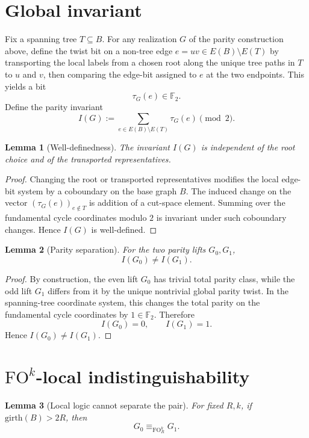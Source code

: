\documentclass[11pt]{article}
\newtheorem{lemma}{Lemma}
\begin{document}
\section{Global invariant}

Fix a spanning tree \(T\subseteq B\). For any realization \(G\) of the parity construction above, define the twist bit on a non-tree edge \(e=uv\in E(B)\setminus E(T)\) by transporting the local labels from a chosen root along the unique tree paths in \(T\) to \(u\) and \(v\), then comparing the edge-bit assigned to \(e\) at the two endpoints. This yields a bit
\[
\tau_G(e)\in \mathbb F_2.
\]
Define the parity invariant
\[
I(G):=\sum_{e\in E(B)\setminus E(T)} \tau_G(e)\pmod 2.
\]

\begin{lemma}[Well-definedness]
The invariant \(I(G)\) is independent of the root choice and of the transported representatives.
\end{lemma}

\begin{proof}
Changing the root or transported representatives modifies the local edge-bit system by a coboundary on the base graph \(B\). The induced change on the vector \((\tau_G(e))_{e\notin T}\) is addition of a cut-space element. Summing over the fundamental cycle coordinates modulo \(2\) is invariant under such coboundary changes. Hence \(I(G)\) is well-defined.
\end{proof}

\begin{lemma}[Parity separation]
For the two parity lifts \(G_0,G_1\),
\[
I(G_0)\neq I(G_1).
\]
\end{lemma}

\begin{proof}
By construction, the even lift \(G_0\) has trivial total parity class, while the odd lift \(G_1\) differs from it by the unique nontrivial global parity twist. In the spanning-tree coordinate system, this changes the total parity on the fundamental cycle coordinates by \(1\in\mathbb F_2\). Therefore
\[
I(G_0)=0,\qquad I(G_1)=1.
\]
Hence \(I(G_0)\neq I(G_1)\).
\end{proof}

\section{\(\mathrm{FO}^k\)-local indistinguishability}

\begin{lemma}[Local logic cannot separate the pair]
For fixed \(R,k\), if \(\mathrm{girth}(B)>2R\), then
\[
G_0\equiv_{\mathrm{FO}^k_R} G_1.
\]
\end{lemma}
\end{document}
